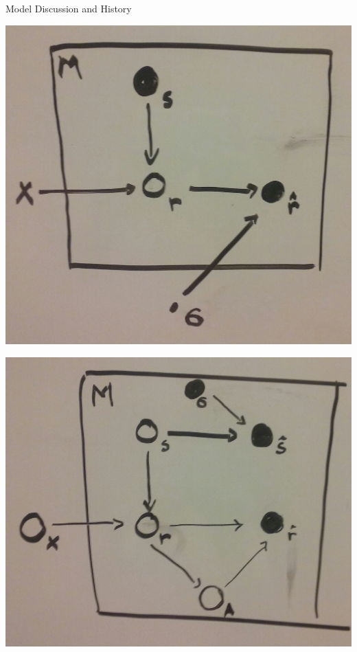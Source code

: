 \documentclass[11pt]{beamer}
\begin{document}
\begin{frame}{Model Discussion and History}
\begin{center}
\begin{multicols}{3}
\includegraphics[height=0.3\textheight]{pictures/1plate.jpg}

\columnbreak
\includegraphics[height=0.3\textheight]{pictures/2plate.jpg}


\end{multicols}
\end{center}
\end{frame}
\end{document}
